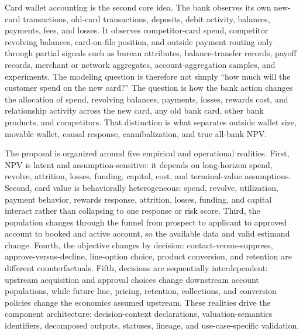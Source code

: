 \documentclass[11pt]{article}
\newcommand{\1}{\mathbf{1}}
\begin{document}
Card wallet accounting is the second core idea. The bank observes its own
new-card transactions, old-card transactions, deposits, debit activity,
balances, payments, fees, and losses. It observes competitor-card spend,
competitor revolving balances, card-on-file position, and outside payment
routing only through partial signals such as bureau attributes, balance-transfer
records, payoff records, merchant or network aggregates, account-aggregation
samples, and experiments. The modeling question is therefore not simply
``how much will the customer spend on the new card?'' The question is how the
bank action changes the allocation of spend, revolving balances, payments,
losses, rewards cost, and relationship activity across the new card, any old
bank card, other bank products, and competitors. That distinction is what
separates outside wallet size, movable wallet, causal response, cannibalization,
and true all-bank NPV.

The proposal is organized around five empirical and operational realities.
First, NPV is latent and assumption-sensitive: it depends on long-horizon spend,
revolve, attrition, losses, funding, capital, cost, and terminal-value
assumptions. Second, card value is behaviorally heterogeneous: spend, revolve,
utilization, payment behavior, rewards response, attrition, losses, funding,
and capital interact rather than collapsing to one response or risk score.
Third, the population changes through the funnel from prospect to applicant to
approved account to booked and active account, so the available data and valid
estimand change. Fourth, the objective changes by decision:
contact-versus-suppress, approve-versus-decline, line-option choice, product
conversion, and retention are different counterfactuals. Fifth, decisions are
sequentially interdependent: upstream acquisition and approval choices change
downstream account populations, while future line, pricing, retention,
collections, and conversion policies change the economics assumed upstream.
These realities drive the component architecture: decision-context declarations,
valuation-semantics identifiers, decomposed outputs, statuses, lineage, and
use-case-specific validation.
\end{document}
